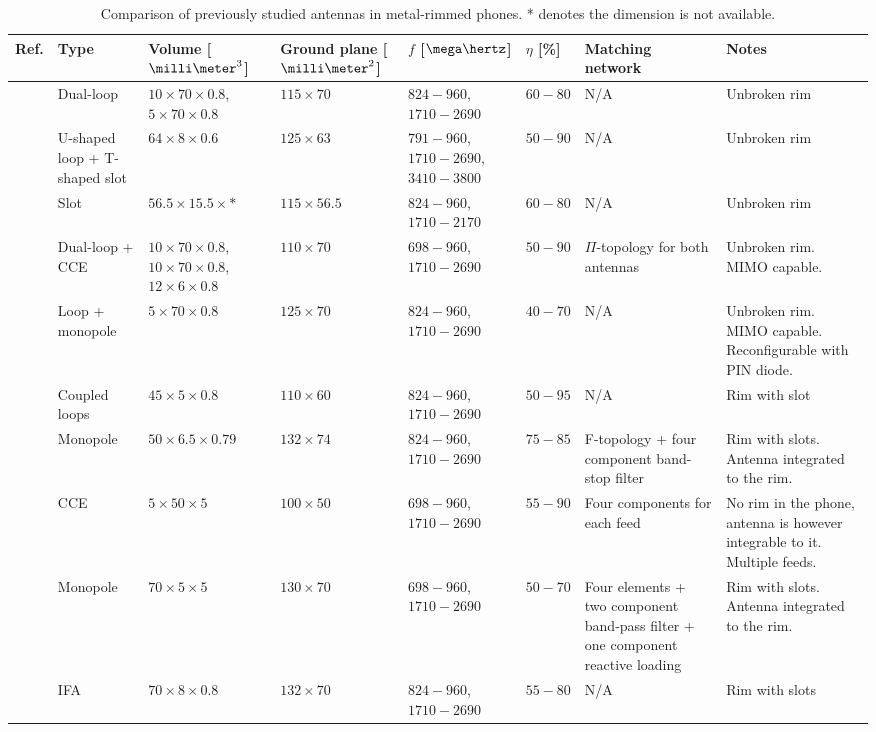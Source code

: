 \begin{table}
\centering
\caption{Comparison of previously studied antennas in metal-rimmed phones. * denotes the dimension is not available.}
\label{tab:metal_rim_comp}
\begin{tabular}{|M{0.03\textheight}|M{0.11\textheight}|M{0.11\textheight}|M{0.11\textheight}|M{0.1\textheight}|M{0.06\textheight}|M{0.15\textheight}|>{\Centering\hspace*{0pt}}M{0.18\textheight}|}
    \hline
    \textbf{Ref.} & \textbf{Type} & \textbf{Volume [$\milli\meter^3$]} & \textbf{Ground plane [$\milli\meter^2$]} &\textbf{$f$ [$\mega\hertz$]} & \textbf{$\eta$ [\%]} & \textbf{Matching network} & \textbf{Notes}\\
    \hline
    \cite{ban_dual_loop} & Dual-loop & $10\times70\times0.8$, $5\times70\times0.8$ & $115\times70$ & $824-960$, $1710-2690$ & $60-80$ & N/A & Unbroken rim\\
    \hline
    \cite{hsu_compact} & U-shaped loop + T-shaped slot & $64\times8\times0.6$ & $125\times63$ & $791-960$, $1710-2690$, $3410-3800$ & $50-90$ & N/A & Unbroken rim\\
    \hline
    \cite{yuan_slot} & Slot & $56.5\times15.5\times*$ & $115\times56.5$ & $824-960$, $1710-2170$ & $60-80$ & N/A & Unbroken rim\\
    \hline
    \cite{stanley_lte_mimo} & Dual-loop + CCE & $10\times70\times0.8$, $10\times70\times0.8$, $12\times6\times0.8$ & $110\times70$ & $698-960$, $1710-2690$ & $50-90$ & $\Pi$-topology for both antennas & Unbroken rim. MIMO capable.\\
    \hline
    \cite{reconf_narrow} & Loop + monopole & $5\times70\times0.8$ & $125\times70$ & $824-960$, $1710-2690$ & $40-70$ & N/A & Unbroken rim. MIMO capable. Re\-con\-fi\-gu\-rable with PIN diode.\\
    \hline
    \cite{hybrid} & Coupled loops & $45\times5\times0.8$ & $110\times60$ & $824-960$, $1710-2690$ & $50-95$ & N/A & Rim with slot\\
    \hline
    \cite{lee_monopole} & Monopole & $50\times6.5\times0.79$ & $132\times74$ & $824-960$, $1710-2690$ & $75-85$ & F-topology + four component band-stop filter & Rim with slots. Antenna integrated to the rim.\\
    \hline
    \cite{valkonen_multifeed} & CCE & $5\times50\times5$ & $100\times50$ & $698-960$, $1710-2690$ & $55-90$ & Four components for each feed & No rim in the phone, antenna is however integrable to it. Multiple feeds.\\
    \hline
    \cite{chen_metal_frame} & Monopole & $70\times5\times5$ & $130\times70$ & $698-960$, $1710-2690$ & $50-70$ & Four elements + two component band-pass filter + one component reactive loading & Rim with slots. Antenna integrated to the rim.\\
    \hline
    \cite{hepta_ifa} & IFA & $70\times8\times0.8$ & $132\times70$ & $824-960$, $1710-2690$ & $55-80$ & N/A & Rim with slots\\
    \hline
\end{tabular}
\end{table}

